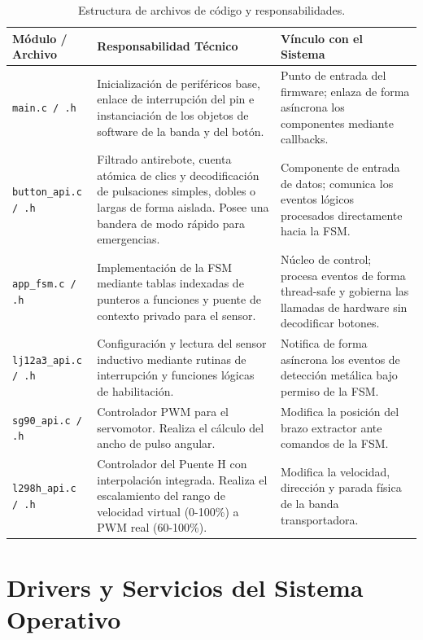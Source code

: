 \documentclass[12pt, letterpaper]{article}
\begin{document}
\begin{table}[H]
\centering
\renewcommand{\arraystretch}{1.2}
\caption{Estructura de archivos de código y responsabilidades.}
\label{tab:arquitectura_software}
\vspace{0.3cm}
\begin{tabularx}{\textwidth}{lXX}
\toprule
\textbf{Módulo / Archivo} & \textbf{Responsabilidad Técnico} & \textbf{Vínculo con el Sistema} \\
\midrule
\texttt{main.c / .h} & Inicialización de periféricos base, enlace de interrupción del pin e instanciación de los objetos de software de la banda y del botón. & Punto de entrada del firmware; enlaza de forma asíncrona los componentes mediante callbacks. \\
\midrule
\texttt{button\_api.c / .h} & Filtrado antirebote, cuenta atómica de clics y decodificación de pulsaciones simples, dobles o largas de forma aislada. Posee una bandera de modo rápido para emergencias. & Componente de entrada de datos; comunica los eventos lógicos procesados directamente hacia la FSM. \\
\midrule
\texttt{app\_fsm.c / .h} & Implementación de la FSM mediante tablas indexadas de punteros a funciones y puente de contexto privado para el sensor. & Núcleo de control; procesa eventos de forma thread-safe y gobierna las llamadas de hardware sin decodificar botones. \\
\midrule
\texttt{lj12a3\_api.c / .h} & Configuración y lectura del sensor inductivo mediante rutinas de interrupción y funciones lógicas de habilitación. & Notifica de forma asíncrona los eventos de detección metálica bajo permiso de la FSM. \\
\midrule
\texttt{sg90\_api.c / .h} & Controlador PWM para el servomotor. Realiza el cálculo del ancho de pulso angular. & Modifica la posición del brazo extractor ante comandos de la FSM. \\
\midrule
\texttt{l298h\_api.c / .h} & Controlador del Puente H con interpolación integrada. Realiza el escalamiento del rango de velocidad virtual (0-100\%) a PWM real (60-100\%). & Modifica la velocidad, dirección y parada física de la banda transportadora. \\
\bottomrule
\end{tabularx}
\end{table}

\section{Drivers y Servicios del Sistema Operativo}
\label{sec:drivers_servicios}
\end{document}
